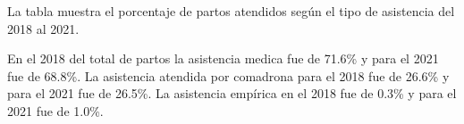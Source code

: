 La tabla muestra el porcentaje de partos atendidos según el tipo de asistencia del 2018 al 2021. 

En el 2018 del total de partos la asistencia medica fue de 71.6\% y para el 2021 fue de 68.8\%. La asistencia atendida por comadrona para el 2018 fue de 26.6\% y para el 2021 fue de 26.5\%. La asistencia empírica en el 2018 fue de 0.3\%  y para el 2021 fue de 1.0\%. 